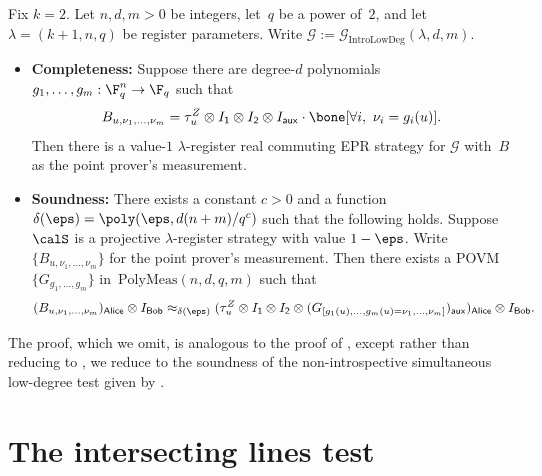 \documentclass[11pt]{article}
\newcommand{\simulpolymeas}[4]{\mathrm{PolyMeas}(#1,#2,#3, #4)}
\newcommand{\game}{\mathscr{G}}
\newcommand{\reg}[1]{{\mathsf{#1}}}
\begin{document}
\begin{theorem}\label{thm:big-simultaneous-planes-low-degree}
Fix $k = 2$.
Let $n, d, m>0$ be integers, let~$q$ be a power of~$2$,
and let $\lambda = (k+1, n, q)$ be register parameters.
Write $\game := \game_{\mathrm{IntroLowDeg}}(\lambda, d, m)$.
\begin{itemize}
\item[$\circ$] \textbf{Completeness:}
		Suppose there are degree-$d$ polynomials $g_1, \ldots, g_m:\F_q^{n}\rightarrow \F_q$ such that
		\begin{equation*}
			B_{u, \nu_1, \ldots, \nu_m} = \tau_u^Z \otimes I_{\reg{1}} \otimes I_{\reg{2}} \otimes I_{\reg{aux}} \cdot \bone[\forall i,~\nu_i = g_i(u)].
		\end{equation*}
		Then there is a value-$1$ $\lambda$-register real
                commuting EPR strategy for $\game$ with~$B$ as the point prover's measurement.
\item[$\circ$] \textbf{Soundness:}
		There exists a constant $c > 0$ and a function $\delta(\eps) = \poly(\eps, d(n+m)/q^c)$ such that the following holds.
		Suppose $\calS$ is a projective $\lambda$-register strategy with value $1-\eps$.
		Write $\{B_{u, \nu_1, \ldots, \nu_m}\}$ for the point prover's measurement.
		Then there exists a POVM $\{G_{g_1, \ldots, g_m}\}$
                in~$\simulpolymeas{n}{d}{q}{m}$ such that
		\begin{equation*}
			(B_{u, \nu_1, \ldots, \nu_m})_{\reg{Alice}} \otimes I_{\reg{Bob}}
				\approx_{\delta(\eps)} (\tau^Z_{u}\otimes I_{\reg{1}} \otimes I_{\reg{2}}
					\otimes (G_{[g_1(u), \ldots, g_m(u) = \nu_1, \ldots, \nu_m]})_{\reg{aux}})_{\reg{Alice}} \otimes I_{\reg{Bob}}.
		\end{equation*}
\end{itemize}
\end{theorem}

The proof, which we omit,
is analogous to the proof of ,
except rather than reducing to ,
we reduce to the soundness of the non-introspective simultaneous low-degree test given by .



\section{The intersecting lines test}\label{sec:intersection}
\end{document}
